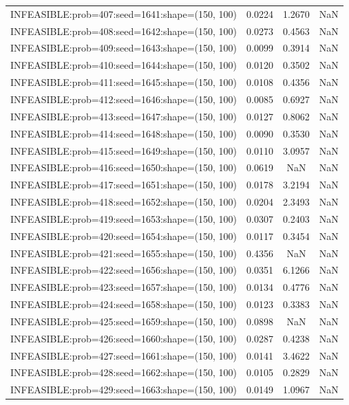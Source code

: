 \begin{longtable}{lccc}
INFEASIBLE:prob=407:seed=1641:shape=(150, 100) & 0.0224 &  1.2670 &    NaN \\
INFEASIBLE:prob=408:seed=1642:shape=(150, 100) & 0.0273 &  0.4563 &    NaN \\
INFEASIBLE:prob=409:seed=1643:shape=(150, 100) & 0.0099 &  0.3914 &    NaN \\
INFEASIBLE:prob=410:seed=1644:shape=(150, 100) & 0.0120 &  0.3502 &    NaN \\
INFEASIBLE:prob=411:seed=1645:shape=(150, 100) & 0.0108 &  0.4356 &    NaN \\
INFEASIBLE:prob=412:seed=1646:shape=(150, 100) & 0.0085 &  0.6927 &    NaN \\
INFEASIBLE:prob=413:seed=1647:shape=(150, 100) & 0.0127 &  0.8062 &    NaN \\
INFEASIBLE:prob=414:seed=1648:shape=(150, 100) & 0.0090 &  0.3530 &    NaN \\
INFEASIBLE:prob=415:seed=1649:shape=(150, 100) & 0.0110 &  3.0957 &    NaN \\
INFEASIBLE:prob=416:seed=1650:shape=(150, 100) & 0.0619 &     NaN &    NaN \\
INFEASIBLE:prob=417:seed=1651:shape=(150, 100) & 0.0178 &  3.2194 &    NaN \\
INFEASIBLE:prob=418:seed=1652:shape=(150, 100) & 0.0204 &  2.3493 &    NaN \\
INFEASIBLE:prob=419:seed=1653:shape=(150, 100) & 0.0307 &  0.2403 &    NaN \\
INFEASIBLE:prob=420:seed=1654:shape=(150, 100) & 0.0117 &  0.3454 &    NaN \\
INFEASIBLE:prob=421:seed=1655:shape=(150, 100) & 0.4356 &     NaN &    NaN \\
INFEASIBLE:prob=422:seed=1656:shape=(150, 100) & 0.0351 &  6.1266 &    NaN \\
INFEASIBLE:prob=423:seed=1657:shape=(150, 100) & 0.0134 &  0.4776 &    NaN \\
INFEASIBLE:prob=424:seed=1658:shape=(150, 100) & 0.0123 &  0.3383 &    NaN \\
INFEASIBLE:prob=425:seed=1659:shape=(150, 100) & 0.0898 &     NaN &    NaN \\
INFEASIBLE:prob=426:seed=1660:shape=(150, 100) & 0.0287 &  0.4238 &    NaN \\
INFEASIBLE:prob=427:seed=1661:shape=(150, 100) & 0.0141 &  3.4622 &    NaN \\
INFEASIBLE:prob=428:seed=1662:shape=(150, 100) & 0.0105 &  0.2829 &    NaN \\
INFEASIBLE:prob=429:seed=1663:shape=(150, 100) & 0.0149 &  1.0967 &    NaN \\

\end{longtable}
